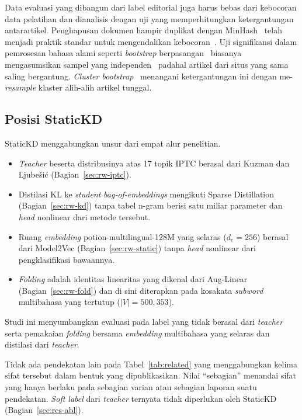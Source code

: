 \documentclass{ieeeaccess}
\newcommand{\en}[1]{\textit{#1}}
\begin{document}
Data evaluasi yang dibangun dari label editorial juga harus bebas dari kebocoran data pelatihan dan dianalisis dengan uji yang memperhitungkan ketergantungan antarartikel. Penghapusan dokumen hampir duplikat dengan MinHash~\cite{broder1997resemblance} telah menjadi praktik standar untuk mengendalikan kebocoran~\cite{lee2022dedup}. Uji signifikansi dalam pemrosesan bahasa alami seperti \en{bootstrap} berpasangan~\cite{koehn2004significance} biasanya mengasumsikan sampel yang independen~\cite{dror2018hitchhiker} padahal artikel dari situs yang sama saling bergantung. \en{Cluster bootstrap}~\cite{field2007bootstrapping} menangani ketergantungan ini dengan me-\en{resample} klaster alih-alih artikel tunggal.

\subsection{Posisi StaticKD}
StaticKD menggabungkan unsur dari empat alur penelitian.
\begin{itemize}
  \item \en{Teacher} beserta distribusinya atas 17 topik IPTC berasal dari Kuzman dan Ljube\v{s}i\'c (Bagian~\ref{sec:rw-iptc}).
  \item Distilasi KL ke \en{student} \en{bag-of-embeddings} mengikuti Sparse Distillation (Bagian~\ref{sec:rw-kd}) tanpa tabel n-gram berisi satu miliar parameter dan \en{head} nonlinear dari metode tersebut.
  \item Ruang \en{embedding} potion-multilingual-128M yang selaras ($d_e=256$) berasal dari Model2Vec (Bagian~\ref{sec:rw-static}) tanpa \en{head} nonlinear dari pengklasifikasi bawaannya.
  \item \en{Folding} adalah identitas linearitas yang dikenal dari Aug-Linear (Bagian~\ref{sec:rw-fold}) dan di sini diterapkan pada kosakata \en{subword} multibahasa yang tertutup ($|V|=500{,}353$).
\end{itemize}
Studi ini menyumbangkan evaluasi pada label yang tidak berasal dari \en{teacher} serta pemakaian \en{folding} bersama \en{embedding} multibahasa yang selaras dan distilasi dari \en{teacher}.

Tidak ada pendekatan lain pada Tabel~\ref{tab:related} yang menggabungkan kelima sifat tersebut dalam bentuk yang dipublikasikan. Nilai ``sebagian'' menandai sifat yang hanya berlaku pada sebagian varian atau sebagian laporan suatu pendekatan. \en{Soft label} dari \en{teacher} ternyata tidak diperlukan oleh StaticKD (Bagian~\ref{sec:res-abl}).
\end{document}
